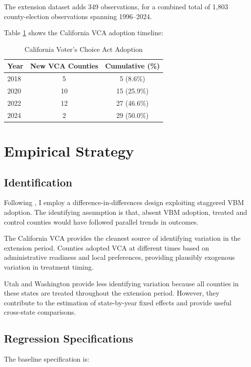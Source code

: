 \documentclass[12pt]{article}
\begin{document}
The extension dataset adds 349 observations, for a combined total of 1,803 county-election observations spanning 1996--2024.

Table \ref{tab:vca_adoption} shows the California VCA adoption timeline:

\begin{table}[H]
\centering
\caption{California Voter's Choice Act Adoption}
\label{tab:vca_adoption}
\begin{tabular}{lcc}
\toprule
Year & New VCA Counties & Cumulative (\%) \\
\midrule
2018 & 5 & 5 (8.6\%) \\
2020 & 10 & 15 (25.9\%) \\
2022 & 12 & 27 (46.6\%) \\
2024 & 2 & 29 (50.0\%) \\
\bottomrule
\end{tabular}
\end{table}

\section{Empirical Strategy}

\subsection{Identification}

Following \citet{thompson2020universal}, I employ a difference-in-differences design exploiting staggered VBM adoption. The identifying assumption is that, absent VBM adoption, treated and control counties would have followed parallel trends in outcomes.

The California VCA provides the cleanest source of identifying variation in the extension period. Counties adopted VCA at different times based on administrative readiness and local preferences, providing plausibly exogenous variation in treatment timing.

Utah and Washington provide less identifying variation because all counties in these states are treated throughout the extension period. However, they contribute to the estimation of state-by-year fixed effects and provide useful cross-state comparisons.

\subsection{Regression Specifications}

The baseline specification is:
\end{document}
